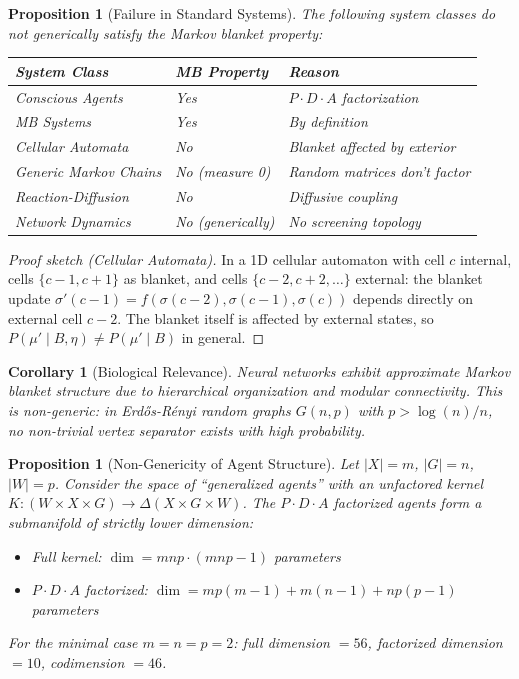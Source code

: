 \documentclass[11pt,a4paper]{article}
\newtheorem{proposition}[theorem]{Proposition}
\newtheorem{corollary}[theorem]{Corollary}
\begin{document}
\begin{proposition}[Failure in Standard Systems]\label{prop:failure}
The following system classes do not generically satisfy the Markov blanket property:
\begin{center}
\begin{tabular}{lll}
\toprule
System Class & MB Property & Reason \\
\midrule
Conscious Agents & Yes & $P \cdot D \cdot A$ factorization \\
MB Systems & Yes & By definition \\
Cellular Automata & No & Blanket affected by exterior \\
Generic Markov Chains & No (measure 0) & Random matrices don't factor \\
Reaction-Diffusion & No & Diffusive coupling \\
Network Dynamics & No (generically) & No screening topology \\
\bottomrule
\end{tabular}
\end{center}
\end{proposition}

\begin{proof}[Proof sketch (Cellular Automata)]
In a 1D cellular automaton with cell $c$ internal, cells $\{c-1, c+1\}$ as blanket, and cells $\{c-2, c+2, \ldots\}$ external: the blanket update $\sigma'(c-1) = f(\sigma(c-2), \sigma(c-1), \sigma(c))$ depends directly on external cell $c-2$. The blanket itself is affected by external states, so $P(\mu' \mid B, \eta) \neq P(\mu' \mid B)$ in general.
\end{proof}

\begin{corollary}[Biological Relevance]\label{cor:bio}
Neural networks exhibit approximate Markov blanket structure due to hierarchical organization and modular connectivity. This is non-generic: in Erd\H{o}s-R\'enyi random graphs $G(n, p)$ with $p > \log(n)/n$, no non-trivial vertex separator exists with high probability.
\end{corollary}

\begin{proposition}[Non-Genericity of Agent Structure]\label{prop:agent-nongenericity}
Let $|X| = m$, $|G| = n$, $|W| = p$. Consider the space of ``generalized agents'' with an unfactored kernel $K : (W \times X \times G) \to \Delta(X \times G \times W)$. The $P \cdot D \cdot A$ factorized agents form a submanifold of strictly lower dimension:
\begin{itemize}[nosep]
    \item Full kernel: $\dim = mnp \cdot (mnp - 1)$ parameters
    \item $P \cdot D \cdot A$ factorized: $\dim = mp(m - 1) + m(n - 1) + np(p - 1)$ parameters
\end{itemize}
For the minimal case $m = n = p = 2$: full dimension $= 56$, factorized dimension $= 10$, codimension $= 46$.
\end{proposition}
\end{document}
